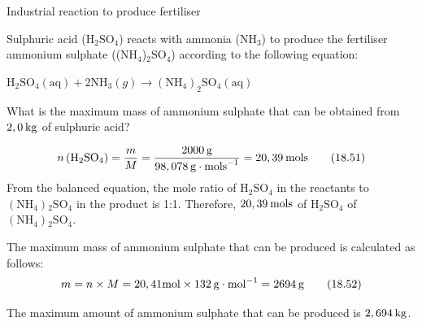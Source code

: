       \noindent 
      \begin{wex}{Industrial reaction to produce fertiliser }
{
\label{m38712*probfhsst!!!underscore!!!id2068}
      \label{m38712*id284606}Sulphuric acid ($\mathrm{H}{}_{2}\mathrm{SO}{}_{4}$) reacts with ammonia ($\mathrm{NH}{}_{3}$) to produce the fertiliser ammonium sulphate (($\mathrm{NH}{}_{4}$)${}_{2}\mathrm{SO}{}_{4}$) according to the following equation:\par 
      \label{m38712*id284690}${\mathrm{H}}_{2}{\mathrm{SO}}_{4}\left(\mathrm{aq}\right)+2{\mathrm{NH}}_{3}\left(g\right)\to {\left({\mathrm{NH}}_{4}\right)}_{2}{\mathrm{SO}}_{4}\left(\mathrm{aq}\right)$
      \par 
      \label{m38712*id284791}What is the maximum mass of ammonium sulphate that can be obtained from $2,0\phantom{\rule{2pt}{0ex}}\mathrm{kg}$ of sulphuric acid?
 \par 
      \vspace{5pt} }
{
      \label{m38712*id284813}\nopagebreak\noindent{}
    \begin{equation}
    n\left({\mathrm{H}}_{2}{\mathrm{SO}}_{4}\right)=\frac{m}{M}=\frac{2 000\phantom{\rule{2pt}{0ex}}\mathrm{g}}{98,078\phantom{\rule{2pt}{0ex}}\mathrm{g}\ensuremath{\cdot}{\mathrm{mols}}^{-1}}=20,39\phantom{\rule{2pt}{0ex}}\mathrm{mols}\tag{18.51}
      \end{equation}
      \label{m38712*id285156}From the balanced equation, the mole ratio of $\mathrm{H}{}_{2}\mathrm{SO}{}_{4}$ in the reactants to $\left(\mathrm{NH}{}_{4}\right){}_{2}\mathrm{SO}{}_{4}$ in the product is 1:1. Therefore, $20,39\phantom{\rule{2pt}{0ex}}\mathrm{mols}$ of $\mathrm{H}{}_{2}\mathrm{SO}{}_{4}$ of $\left(\mathrm{NH}{}_{4}\right){}_{2}\mathrm{SO}{}_{4}$.\par 
{}
      \label{m38712*id285290}The maximum mass of ammonium sulphate that can be produced is calculated as follows:
      \label{m38712*id285296}\nopagebreak\noindent{}
    \begin{equation}
    m=n\ensuremath{\times}M=20,41\mathrm{mol}\ensuremath{\times}132\phantom{\rule{2pt}{0ex}}\mathrm{g}\ensuremath{\cdot}{\mathrm{mol}}^{-1}=2694\phantom{\rule{2pt}{0ex}}\mathrm{g}\tag{18.52}
      \end{equation}
      \par 
      \label{m38712*id285362}The maximum amount of ammonium sulphate that can be produced is $2,694\phantom{\rule{2pt}{0ex}}\mathrm{kg}$.
 \par 
}
    \end{wex}
